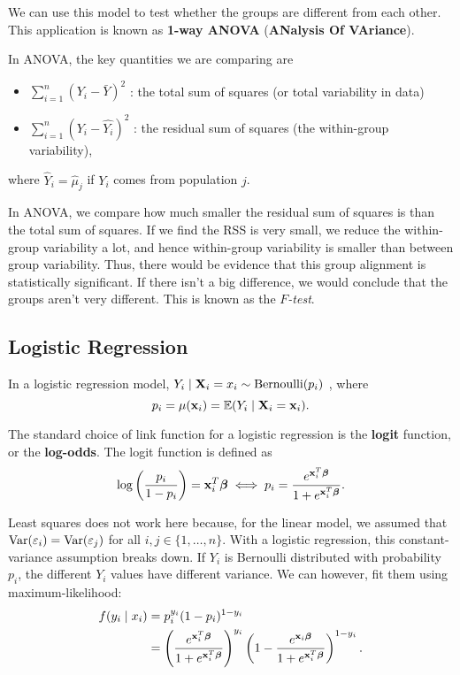 \begin{definition}
		We can use this model to test whether the groups are different from each other. This application is known as \textbf{1-way ANOVA} (\textbf{ANalysis Of VAriance}).
\end{definition}

In ANOVA, the key quantities we are comparing are 

\begin{itemize}
	\item $\sum_{i=1}^{n} (Y_i-\bar{Y})^2$ : the total sum of squares (or total variability in data)
	\item $\sum^n_{i=1}(Y_i-\hat{Y_i})^2$ : the residual sum of squares (the within-group variability),
\end{itemize}
where $\hat{Y}_i=\hat{\mu}_j$ if $Y_i$ comes from population $j$. 

\begin{remark}
	In ANOVA, we compare how much smaller the residual sum of squares is than the total sum of squares. If we find the RSS is very small, we reduce the within-group variability a lot, and hence within-group variability is smaller than between group variability. Thus, there would be evidence that this group alignment is statistically significant. If there isn't a big difference, we would conclude that the groups aren't very different. This is known as the \textit{$F$-test}.
\end{remark}

\subsection{Logistic Regression}

In a logistic regression model, $Y_i\mid \mathbf X_i=x_i \sim \operatorname*{Bernoulli}(p_i)$ , where \[
p_i=\mu(\mathbf x_i)=\mathbb E(Y_i\mid\mathbf X_i=\mathbf x_i)
.\] 

\begin{definition}
	The standard choice of link function for a logistic regression is the \textbf{logit} function, or the \textbf{log-odds}. The logit function is defined as
	\[
		\log\left( \frac{p_i}{1-p_i} \right) =\mathbf x_i^T{\boldsymbol{\beta}} \;\Longleftrightarrow\; p_i=\frac{{e}^{\mathbf x_i^T{\boldsymbol{\beta}} }}{1+e^{\mathbf x_i^T{\boldsymbol{\beta}}}}
	.\] 
\end{definition}

\begin{remark}
	Least squares does not work here because, for the linear model, we assumed that $\operatorname*{Var}(\varepsilon_i)=\operatorname*{Var}(\varepsilon_j)$ for all $i,j\in\{1,\ldots, n\}.$ With a logistic regression, this constant-variance assumption breaks down. If $Y_i$ is Bernoulli distributed with probability $p_i$, the different $Y_i$ values have different variance. We can however, fit them using maximum-likelihood:
	\begin{align*}
			f(y_i\mid x_i) &= p_i^{y_i}(1-p_i)^{1-y_i} \\
						   &= \left( \frac{e^{\mathbf x_i^T{\boldsymbol{\beta}}}}{1+e^{\mathbf x_i^T{\boldsymbol{\beta}}}} \right)^{y_i}\left(1-\frac{e^{\mathbf x_i{\boldsymbol{\beta}}}}{1+e^{\mathbf x_i^T{\boldsymbol{\beta}}}}  \right)^{1-y_i}  
.\end{align*}
\end{remark}

